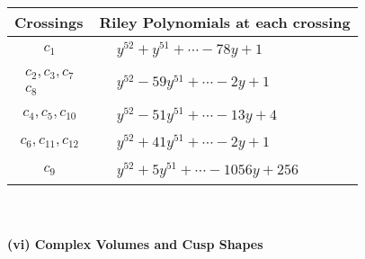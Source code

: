 \documentclass[1p]{elsarticle_modified}
\theoremstyle{definition}
\begin{document}
\begin{tabular}{m{50pt}|m{274pt}}
Crossings & \hspace{64pt}Riley Polynomials at each crossing \\
\hline $$\begin{aligned}c_{1}\end{aligned}$$&$\begin{aligned}
&y^{52}+y^{51}+\cdots-78 y+1
\end{aligned}$\\
\hline $$\begin{aligned}c_{2},c_{3},c_{7}\\c_{8}\end{aligned}$$&$\begin{aligned}
&y^{52}-59 y^{51}+\cdots-2 y+1
\end{aligned}$\\
\hline $$\begin{aligned}c_{4},c_{5},c_{10}\end{aligned}$$&$\begin{aligned}
&y^{52}-51 y^{51}+\cdots-13 y+4
\end{aligned}$\\
\hline $$\begin{aligned}c_{6},c_{11},c_{12}\end{aligned}$$&$\begin{aligned}
&y^{52}+41 y^{51}+\cdots-2 y+1
\end{aligned}$\\
\hline $$\begin{aligned}c_{9}\end{aligned}$$&$\begin{aligned}
&y^{52}+5 y^{51}+\cdots-1056 y+256
\end{aligned}$\\
\hline
\end{tabular}\\~\\
\newpage\flushleft \textbf{(vi) Complex Volumes and Cusp Shapes}
\end{document}
